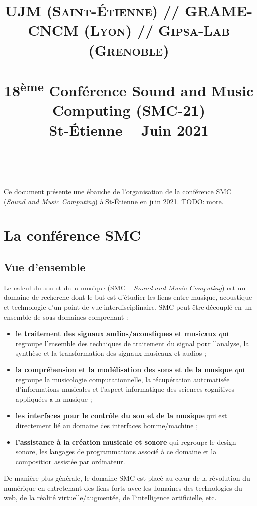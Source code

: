 \documentclass[fontsize=12pt]{scrartcl} %
\title{	
\normalfont \normalsize 
\textsc{UJM (Saint-Étienne) // GRAME-CNCM (Lyon) // Gipsa-Lab (Grenoble)} \\ [25pt] %
\horrule{0.5pt} \\[0.4cm] %
\huge 18\textsuperscript{ème} Conférence Sound and Music Computing (SMC-21)\\ St-Étienne -- Juin 2021 \\ %
\horrule{2pt} \\[0.5cm] %
}
\date{} %
\numberwithin{equation}{section} %
\numberwithin{figure}{section} %
\numberwithin{table}{section} %
\begin{document}
\maketitle %

Ce document présente une ébauche de l'organisation de la conférence SMC (\textit{Sound and Music Computing}) à St-Étienne en juin 2021. TODO: more.

\tableofcontents


\section{La conférence SMC}

\subsection{Vue d'ensemble}

Le calcul du son et de la musique (SMC -- \textit{Sound and Music Computing}) est un domaine de recherche dont le but est d'étudier les liens entre musique, acoustique et technologie d'un point de vue interdisciplinaire. SMC peut être découplé en un ensemble de sous-domaines comprenant :

\begin{itemize}
  \item \textbf{le traitement des signaux audios/acoustiques et musicaux} qui regroupe l'ensemble des techniques de traitement du signal pour l'analyse, la synthèse et la transformation des signaux musicaux et audios ;
  \item \textbf{la compréhension et la modélisation des sons et de la musique} qui regroupe la musicologie computationnelle, la récupération automatisée d'informations musicales et l'aspect informatique des sciences cognitives appliquées à la musique ;
  \item \textbf{les interfaces pour le contrôle du son et de la musique} qui est directement lié au domaine des interfaces homme/machine ;
  \item \textbf{l'assistance à la création musicale et sonore} qui regroupe le design sonore, les langages de programmations associé à ce domaine et la composition assistée par ordinateur.
\end{itemize}

De manière plus générale, le domaine SMC est placé au cœur de la révolution du numérique en entretenant des liens forts avec les domaines des technologies du web, de la réalité virtuelle/augmentée, de l'intelligence artificielle, etc. 
\end{document}
